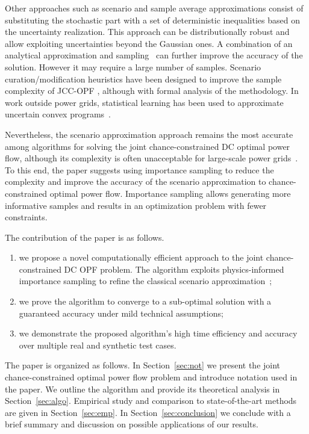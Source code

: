 \documentclass{IEEEtran4PSCC}
\begin{document}
Other approaches such as scenario and sample average approximations \cite{calafiore2006scenario,garatti2019risk, vrakopoulou2013probabilistic,nemirovski2006scenario} consist of substituting the stochastic part with a set of deterministic inequalities based on the uncertainty realization. This approach can be distributionally robust and allow exploiting uncertainties beyond the Gaussian ones. A combination of an analytical approximation and sampling~\cite{hou2020chance} can further improve the accuracy of the solution. However it may require a large number of samples. Scenario curation/modification heuristics have been designed to improve the sample complexity of JCC-OPF \cite{mezghani2020stochastic}, although with formal analysis of the methodology. In work outside power grids, statistical learning has been used to approximate uncertain convex programs~\cite{vapnik1999overview,maximov2016tight,campi2020scenario}.

Nevertheless, the scenario approximation approach remains the most accurate among algorithms for solving the joint chance-constrained DC optimal power flow, although its complexity is often unacceptable for large-scale power grids~\cite{sakhavand2020new}. To this end, the paper suggests using importance sampling to reduce the complexity and improve the accuracy of the scenario approximation to chance-constrained optimal power flow. Importance sampling allows generating more informative samples and results in an optimization problem with fewer constraints. 

The contribution of the paper is as follows. 
\begin{enumerate}
  \item we propose a novel computationally efficient 
  approach to the joint chance-constrained DC OPF problem. The algorithm exploits physics-informed importance sampling to refine the classical scenario approximation~\cite{calafiore2006scenario};
  \item we prove the algorithm to converge to a sub-optimal solution with a guaranteed accuracy under mild technical assumptions; 
  \item we demonstrate the proposed algorithm's high time efficiency and accuracy over multiple real and synthetic test cases. 
\end{enumerate}

The paper is organized as follows.
In Section~\ref{sec:not} we present the joint chance-constrained optimal power flow problem and introduce notation used in the paper. We outline the algorithm and provide its theoretical analysis in Section~\ref{sec:algo}. Empirical study and comparison to state-of-the-art methods are given in Section~\ref{sec:emp}. In Section~\ref{sec:conclusion} we conclude with a brief summary and discussion on possible applications of our results.
\end{document}
